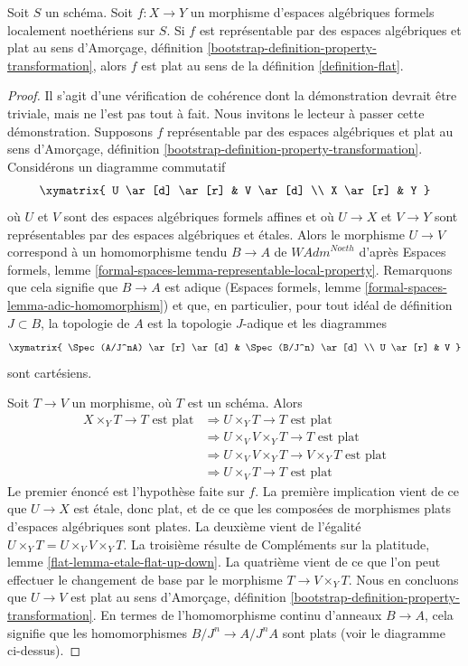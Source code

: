 \begin{lemma}
\label{lemma-representable-flat}
Soit $S$ un schéma. Soit $f : X \to Y$ un morphisme d'espaces algébriques
formels localement noethériens sur $S$. Si $f$ est représentable par des
espaces algébriques et plat au sens d'Amorçage, définition
\ref{bootstrap-definition-property-transformation}, alors $f$ est plat
au sens de la définition \ref{definition-flat}.
\end{lemma}

\begin{proof}
Il s'agit d'une vérification de cohérence dont la démonstration devrait
être triviale, mais ne l'est pas tout à fait. Nous invitons le lecteur à
passer cette démonstration. Supposons $f$ représentable par des espaces
algébriques et plat au sens d'Amorçage, définition
\ref{bootstrap-definition-property-transformation}. Considérons un
diagramme commutatif
$$
\xymatrix{
U \ar[d] \ar[r] & V \ar[d] \\
X \ar[r] & Y
}
$$
où $U$ et $V$ sont des espaces algébriques formels affines et où $U \to X$
et $V \to Y$ sont représentables par des espaces algébriques et étales.
Alors le morphisme $U \to V$ correspond à un homomorphisme tendu
$B \to A$ de $\textit{WAdm}^{Noeth}$ d'après Espaces formels, lemme
\ref{formal-spaces-lemma-representable-local-property}. Remarquons que
cela signifie que $B \to A$ est adique (Espaces formels, lemme
\ref{formal-spaces-lemma-adic-homomorphism}) et que, en particulier, pour
tout idéal de définition $J \subset B$, la topologie de $A$ est la
topologie $J$-adique et les diagrammes
$$
\xymatrix{
\Spec(A/J^nA) \ar[r] \ar[d] & \Spec(B/J^n) \ar[d] \\
U \ar[r] & V
}
$$
sont cartésiens.

\medskip\noindent
Soit $T \to V$ un morphisme, où $T$ est un schéma. Alors
\begin{align*}
X \times_Y T \to T\text{ est plat}
& \Rightarrow
U \times_Y T \to T\text{ est plat} \\
& \Rightarrow
U \times_V V \times_Y T \to T\text{ est plat} \\
& \Rightarrow
U \times_V V \times_Y T \to V \times_Y T\text{ est plat} \\
& \Rightarrow
U \times_V T \to T\text{ est plat}
\end{align*}
Le premier énoncé est l'hypothèse faite sur $f$. La première implication
vient de ce que $U \to X$ est étale, donc plat, et de ce que les composées
de morphismes plats d'espaces algébriques sont plates. La deuxième vient
de l'égalité $U \times_Y T = U \times_V V \times_Y T$. La troisième
résulte de Compléments sur la platitude, lemme
\ref{flat-lemma-etale-flat-up-down}. La quatrième vient de ce que l'on peut
effectuer le changement de base par le morphisme $T \to V \times_Y T$.
Nous en concluons que $U \to V$ est plat au sens d'Amorçage, définition
\ref{bootstrap-definition-property-transformation}. En termes de
l'homomorphisme continu d'anneaux $B \to A$, cela signifie que les
homomorphismes $B/J^n \to A/J^nA$ sont plats (voir le diagramme ci-dessus).


\end{proof}
